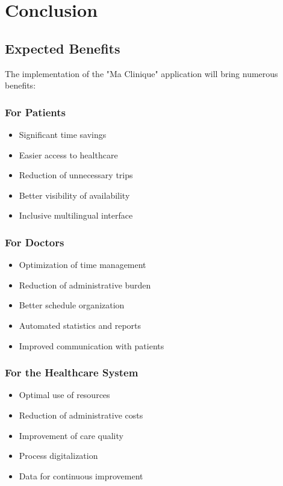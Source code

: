 \documentclass[12pt,a4paper]{report}
\begin{document}
\chapter{Conclusion}

\section{Expected Benefits}

The implementation of the "Ma Clinique" application will bring numerous benefits:

\subsection{For Patients}
\begin{itemize}
    \item Significant time savings
    \item Easier access to healthcare
    \item Reduction of unnecessary trips
    \item Better visibility of availability
    \item Inclusive multilingual interface
\end{itemize}

\subsection{For Doctors}
\begin{itemize}
    \item Optimization of time management
    \item Reduction of administrative burden
    \item Better schedule organization
    \item Automated statistics and reports
    \item Improved communication with patients
\end{itemize}

\subsection{For the Healthcare System}
\begin{itemize}
    \item Optimal use of resources
    \item Reduction of administrative costs
    \item Improvement of care quality
    \item Process digitalization
    \item Data for continuous improvement
\end{itemize}
\end{document}
